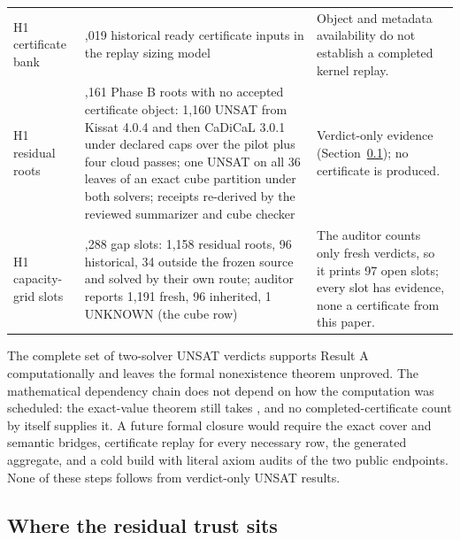 \documentclass{anvil-paper}
\newcommand{\hnoFortyNine}{\lean{hno49}}
\theoremstyle{definition}
\begin{document}
\begin{table}[htbp]
\begin{tabularx}{\textwidth}{@{}>{\raggedright\arraybackslash}p{}>{\raggedright\arraybackslash}X>{\raggedright\arraybackslash}p{}@{}}
H1 certificate bank & 12,019 historical ready certificate inputs in the replay sizing model & Object and metadata availability do not establish a completed kernel replay. \\
H1 residual roots & 1,161 Phase B roots with no accepted certificate object: 1,160 UNSAT from Kissat 4.0.4 and then CaDiCaL 3.0.1 under declared caps over the pilot plus four cloud passes; one UNSAT on all 36 leaves of an exact cube partition under both solvers; receipts re-derived by the reviewed summarizer and cube checker & Verdict-only evidence (Section~\ref{sec:trust}); no certificate is produced. \\
H1 capacity-grid slots & 1,288 gap slots: 1,158 residual roots, 96 historical, 34 outside the frozen source and solved by their own route; auditor reports 1,191 fresh, 96 inherited, 1 UNKNOWN (the cube row) & The auditor counts only fresh verdicts, so it prints 97 open slots; every slot has evidence, none a certificate from this paper. \\
\bottomrule
\end{tabularx}
\end{table}

The complete set of two-solver UNSAT verdicts supports Result A computationally and leaves the formal nonexistence theorem unproved. The mathematical dependency chain does not depend on how the computation was scheduled: the exact-value theorem still takes \hnoFortyNine, and no completed-certificate count by itself supplies it. A future formal closure would require the exact cover and semantic bridges, certificate replay for every necessary row, the generated aggregate, and a cold build with literal axiom audits of the two public endpoints. None of these steps follows from verdict-only UNSAT results.

\subsection{Where the residual trust sits}\label{sec:trust}
\end{document}
